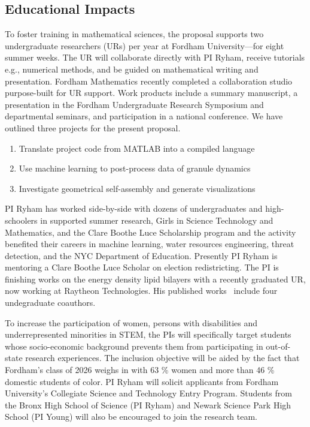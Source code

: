 \subsection{Educational Impacts}
\label{subsec:Educational_plans}
To foster training in mathematical sciences,
the proposal supports two undergraduate researchers
(URs) per year at Fordham University---for eight summer weeks.
The UR will collaborate directly with PI Ryham,
receive tutorials e.g., numerical methods,
and be guided on mathematical writing and presentation.
Fordham Mathematics recently completed a collaboration studio 
purpose-built for UR support.
Work products include a summary manuscript,
a presentation in the Fordham Undergraduate Research Symposium
and departmental seminars, and participation in a national conference.
We have outlined three projects for the present proposal.
\begin{enumerate}[noitemsep,topsep=0pt]
\item Translate project code from MATLAB into a compiled language 
\item Use machine learning to post-process data of granule dynamics
\item Investigate geometrical self-assembly and generate visualizations
\end{enumerate}
PI Ryham has worked side-by-side with dozens of
undergraduates and high-schoolers in
supported summer research, Girls in Science Technology and Mathematics,
and the Clare Boothe Luce Scholarship program
and the activity benefited their careers in
machine learning, water resources engineering, threat detection,
and the NYC Department of Education.
Presently PI Ryham is mentoring a Clare Boothe Luce Scholar on election redistricting.
The PI is finishing works on the energy density lipid  bilayers
with a recently graduated UR, now working at Raytheon Technologies.
His published works~\cite{RYHAM20112929, RyWaCo13, RyKlYaCo16} include
four undegraduate coauthors.


To increase the participation of women,
persons with disabilities and underrepresented minorities in STEM,
the PIs will specifically target students
whose socio-economic background prevents them from participating in
out-of-state research experiences.
The inclusion objective will be aided by the fact that  
Fordham's class of 2026 weighs in with 63 \% women
and more than 46 \% domestic students of color. 
PI Ryham will solicit applicants from
Fordham University's Collegiate Science and Technology Entry Program.
Students from the Bronx High School of Science (PI Ryham) and Newark
Science Park High School (PI Young) will also be encouraged to join the
research team. 

